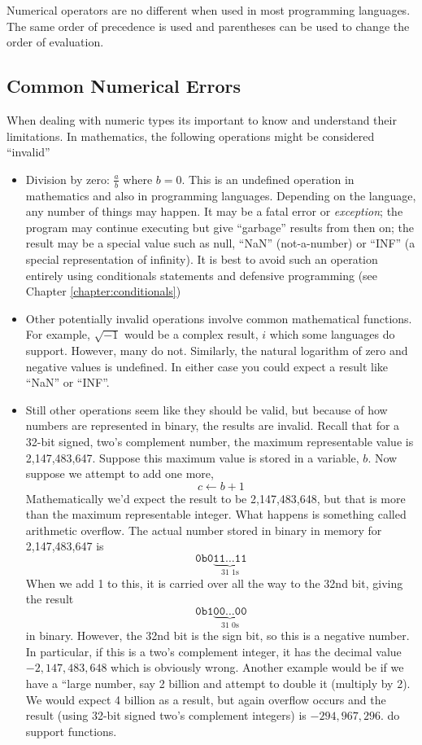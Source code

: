 Numerical operators are no different when used in most programming languages.
The same order of precedence is used and parentheses can be used to change
the order of evaluation.

\subsection{Common Numerical Errors}
\label{subsection:commonNumericalErrors}

When dealing with numeric types its important to know and understand 
their limitations.  In mathematics, the following operations might be
considered ``invalid''
\begin{itemize}
  \item Division by zero: $\frac{a}{b}$ where $b = 0$.  This is an 
  undefined operation in mathematics and also in programming languages.
  Depending on the language, any number of things may happen.  It may 
  be a fatal error or \emph{exception}; the program may continue executing
  but give ``garbage'' results from then on; the result may be a special value
  such as null, ``NaN'' (not-a-number) or ``INF'' (a special representation of
  infinity).  It is best to avoid such an operation entirely using conditionals statements and
  \gls{defensive programming} (see Chapter \ref{chapter:conditionals})

  \item Other potentially invalid operations involve common mathematical functions.
  For example, $\sqrt{-1}$ would be a complex result, $i$ which some languages 
  do support.  However, many do not.  Similarly, the natural logarithm of zero and
  negative values is undefined.  In either case you could expect a result like ``NaN''
  or ``INF''.
  
  \item Still other operations seem like they should be valid, but because of how
  numbers are represented in binary, the results are invalid.  Recall that for a 
  32-bit signed, two's complement number, the maximum representable value 
  is 2,147,483,647.  Suppose this maximum value is stored in a variable, $b$.
  Now suppose we attempt to add one more, 
  	$$c \leftarrow b + 1$$
  Mathematically we'd expect the result to be 2,147,483,648, but that is more than
  the maximum representable integer.  What happens is something called arithmetic
  \gls{overflow}.  The actual number stored in binary in memory for 2,147,483,647 is
    $$\texttt{0b0}\underbrace{\texttt{11}\ldots\texttt{11}}_{\text{31 1s}}$$
  When we add 1 to this, it is carried over all the way to the 32nd bit, giving the 
  result 
    $$\texttt{0b1}\underbrace{\texttt{00}\ldots\texttt{00}}_{\text{31 0s}}$$
  in binary.  However, the 32nd bit is the sign bit, so this is a negative number.
  In particular, if this is a two's complement integer, it has the decimal value
  $-2,147,483,648$ which is obviously wrong.  Another example would be if we have a
  ``large number, say 2 billion and attempt to double it (multiply by 2).  We would
  expect 4 billion as a result, but again overflow occurs and the result (using 32-bit
  signed two's complement integers) is $-294,967,296$.
  do support  functions.  


\end{itemize}
